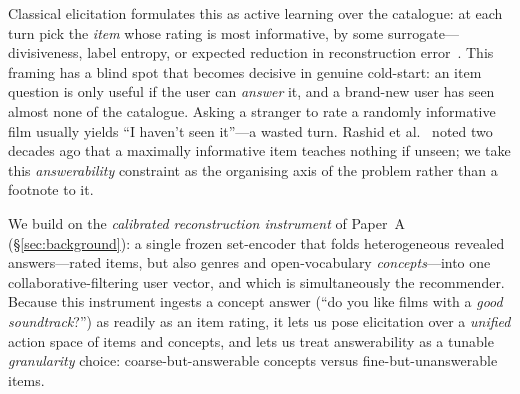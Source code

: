 \documentclass[11pt]{article}
\begin{document}
Classical elicitation formulates this as active learning over the catalogue: at each turn pick the
\emph{item} whose rating is most informative, by some surrogate---divisiveness, label entropy, or
expected reduction in reconstruction error~\cite{rashid,golbandi11,elahi16}. This framing has a blind
spot that becomes decisive in genuine cold-start: an item question is only useful if the user can
\emph{answer} it, and a brand-new user has seen almost none of the catalogue. Asking a stranger to rate
a randomly informative film usually yields ``I haven't seen it''---a wasted turn. Rashid et
al.~\cite{rashid} noted two decades ago that a maximally informative item teaches nothing if unseen; we
take this \emph{answerability} constraint as the organising axis of the problem rather than a footnote to
it.

We build on the \emph{calibrated reconstruction instrument} of Paper~A (\S\ref{sec:background}): a single
frozen set-encoder that folds heterogeneous revealed answers---rated items, but also genres and
open-vocabulary \emph{concepts}---into one collaborative-filtering user vector, and which is
simultaneously the recommender. Because this instrument ingests a concept answer (``do you like films
with a \emph{good soundtrack}?'') as readily as an item rating, it lets us pose elicitation over a
\emph{unified} action space of items and concepts, and lets us treat answerability as a tunable
\emph{granularity} choice: coarse-but-answerable concepts versus fine-but-unanswerable items.
\end{document}
